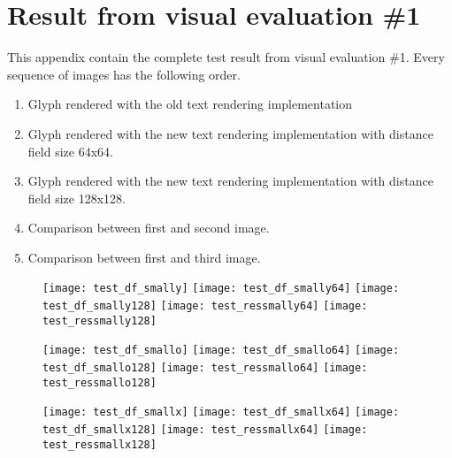\chapter{Result from visual evaluation \#1}
This appendix contain the complete test result from visual evaluation \#1. Every sequence of images has the following order.

\begin{enumerate}
  \item Glyph rendered with the old text rendering implementation
  \item Glyph rendered with the new text rendering implementation with distance field size 64x64.
  \item Glyph rendered with the new text rendering implementation with distance field size 128x128.
  \item Comparison between first and second image.
  \item Comparison between first and third image.
\end{enumerate}

\begin{figure}[H]
  \texttt{[image: test\_df\_smally]}
\endminipage\hfill
{}
  \texttt{[image: test\_df\_smally64]}
\endminipage\hfill
{}
  \texttt{[image: test\_df\_smally128]}
\endminipage\hfill
{}
  \texttt{[image: test\_ressmally64]}
\endminipage\hfill
{}
  \texttt{[image: test\_ressmally128]}
\endminipage\hfill
\end{figure}

\begin{figure}[H]
  \texttt{[image: test\_df\_smallo]}
\endminipage\hfill
{}
  \texttt{[image: test\_df\_smallo64]}
\endminipage\hfill
{}
  \texttt{[image: test\_df\_smallo128]}
\endminipage\hfill
{}
  \texttt{[image: test\_ressmallo64]}
\endminipage\hfill
{}
  \texttt{[image: test\_ressmallo128]}
\endminipage\hfill
\end{figure}

\begin{figure}[H]
  \texttt{[image: test\_df\_smallx]}
\endminipage\hfill
{}
  \texttt{[image: test\_df\_smallx64]}
\endminipage\hfill
{}
  \texttt{[image: test\_df\_smallx128]}
\endminipage\hfill
{}
  \texttt{[image: test\_ressmallx64]}
\endminipage\hfill
{}
  \texttt{[image: test\_ressmallx128]}
\endminipage\hfill
\end{figure}

